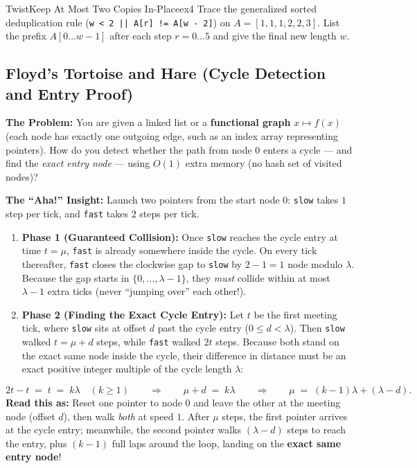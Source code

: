 \documentclass[11pt,a4paper]{article}
\theoremstyle{definition}
\newcommand{\painbeat}{\textbf{\color{accentamber}The Problem:} }
\newcommand{\ahabeat}{\textbf{\color{accentteal}The ``Aha!'' Insight:} }
\begin{document}
\begin{tryitbox}{Twist}{Keep At Most Two Copies In-Place}{ex4}
Trace the generalized sorted deduplication rule (\texttt{w < 2 || A[r] != A[w - 2]}) on $A = [1, 1, 1, 2, 2, 3]$. List the prefix $A[0 \dots w-1]$ after each step $r = 0 \dots 5$ and give the final new length $w$.
\end{tryitbox}

\subsection{Floyd's Tortoise and Hare (Cycle Detection and Entry Proof)}

\painbeat You are given a linked list or a \textbf{functional graph} $x \mapsto f(x)$ (each node has exactly one outgoing edge, such as an index array representing pointers). How do you detect whether the path from node $0$ enters a cycle --- and find the \emph{exact entry node} --- using $O(1)$ extra memory (no hash set of visited nodes)?

\ahabeat Launch two pointers from the start node $0$: \texttt{slow} takes $1$ step per tick, and \texttt{fast} takes $2$ steps per tick.
\begin{enumerate}[itemsep=2pt, topsep=2pt]
    \item \textbf{Phase 1 (Guaranteed Collision):} Once \texttt{slow} reaches the cycle entry at time $t = \mu$, \texttt{fast} is already somewhere inside the cycle. On every tick thereafter, \texttt{fast} closes the clockwise gap to \texttt{slow} by $2 - 1 = 1$ node modulo $\lambda$. Because the gap starts in $\{0, \dots, \lambda - 1\}$, they \emph{must} collide within at most $\lambda - 1$ extra ticks (never ``jumping over'' each other!).
    \item \textbf{Phase 2 (Finding the Exact Cycle Entry):} Let $t$ be the first meeting tick, where \texttt{slow} sits at offset $d$ past the cycle entry ($0 \le d < \lambda$). Then \texttt{slow} walked $t = \mu + d$ steps, while \texttt{fast} walked $2t$ steps. Because both stand on the exact same node inside the cycle, their difference in distance must be an exact positive integer multiple of the cycle length $\lambda$:
\end{enumerate}

\begin{formulabox}
$$2t - t \;=\; t \;=\; k\lambda \quad (k \ge 1) \qquad\Longrightarrow\qquad \mu + d \;=\; k\lambda \qquad\Longrightarrow\qquad \mu \;=\; (k - 1)\lambda + (\lambda - d).$$
\textbf{Read this as:} Reset one pointer to node $0$ and leave the other at the meeting node (offset $d$), then walk \emph{both} at speed $1$. After $\mu$ steps, the first pointer arrives at the cycle entry; meanwhile, the second pointer walks $(\lambda - d)$ steps to reach the entry, plus $(k - 1)$ full laps around the loop, landing on the \textbf{exact same entry node}!
\end{formulabox}
\end{document}
